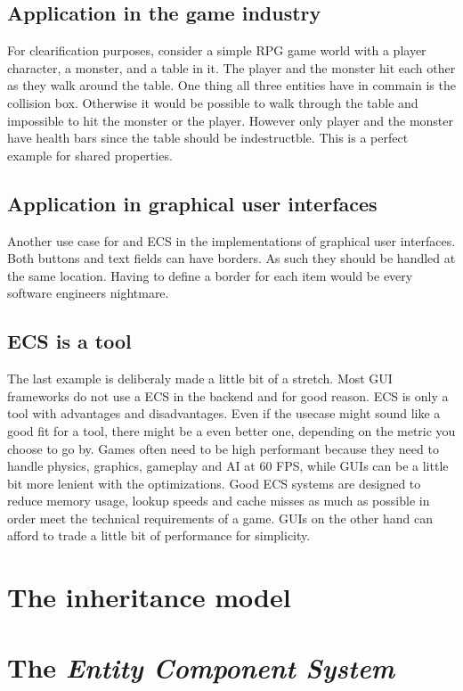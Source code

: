 \documentclass{article}
\begin{document}
    \subsection{Application in the game industry}
    For clearification purposes, consider a simple RPG game world with a player character, a monster, and a table in it. The player and the monster hit each other as they walk around the table. One thing all three entities have in commain is the collision box. Otherwise it would be possible to walk through the table and impossible to hit the monster or the player. However only player and the monster have health bars since the table should be indestructble. 
    This is a perfect example for shared properties.

    \subsection{Application in graphical user interfaces}
    Another use case for and ECS in the implementations of graphical user interfaces. Both buttons and text fields can have borders. As such they should be handled at the same location. Having to define a border for each item would be every software engineers nightmare.

    \subsection{ECS is a tool}
    The last example is deliberaly made a little bit of a stretch. Most GUI frameworks do not use a ECS in the backend and for good reason. ECS is only a tool with advantages and disadvantages. Even if the usecase might sound like a good fit for a tool, there might be a even better one, depending on the metric you choose to go by. Games often need to be high performant because they need to handle physics, graphics, gameplay and AI at 60 FPS, while GUIs can be a little bit more lenient with the optimizations. 
    Good ECS systems are designed to reduce memory usage, lookup speeds and cache misses as much as possible in order meet the technical requirements of a game. GUIs on the other hand can afford to trade a little bit of performance for simplicity.

    \section{The inheritance model}

    \section{The \textit{Entity Component System}}
\end{document}

